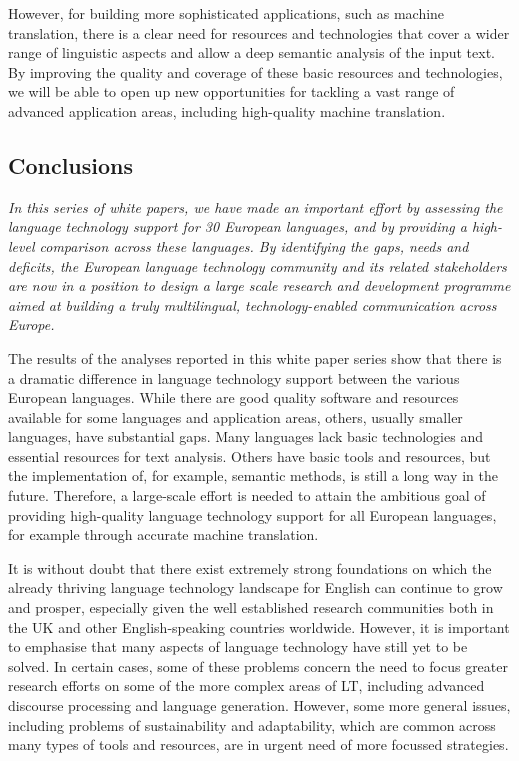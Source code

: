 \begin{multicols}{2}
However, for building more sophisticated applications, such as machine translation, there is a clear need for resources and technologies that cover a wider range of linguistic aspects and allow a deep semantic analysis of the input text. By improving the quality and coverage of these basic resources and technologies, we will be able to open up new opportunities for tackling a vast range of advanced application areas, including high-quality machine translation.

\subsection{Conclusions}

\emph{In this series of white papers, we have made an important effort by assessing the language technology support for 30 European languages, and by providing a high-level comparison across these languages. By identifying the gaps, needs and deficits, the European language technology community and its related stakeholders are now in a position to design a large scale research and development programme aimed at building a truly multilingual, technology-enabled communication across Europe.}

The results of the analyses reported in this white paper series show that there is a dramatic difference in language technology support between the various European languages. While there are good quality software and resources available for some languages and application areas, others, usually smaller languages, have substantial gaps. Many languages lack basic technologies and essential resources for text analysis. Others have basic tools and resources, but the implementation of, for example, semantic methods, is still a long way in the future. Therefore, a large-scale effort is needed to attain the ambitious goal of providing high-quality language technology support for all European languages, for example through accurate machine translation.

It is without doubt that there exist extremely strong foundations on which the already thriving language technology landscape for English can continue to grow and prosper, especially given the well established research communities both in the UK and other English-speaking countries worldwide. However, it is important to emphasise that many aspects of language technology have still yet to be solved. In certain cases, some of these problems concern the need to focus greater research efforts on some of the more complex areas of LT, including advanced discourse processing and language generation. However, some more general issues, including problems of sustainability and adaptability, which are common across many types of tools and resources, are in urgent need of more focussed strategies.


\end{multicols}
